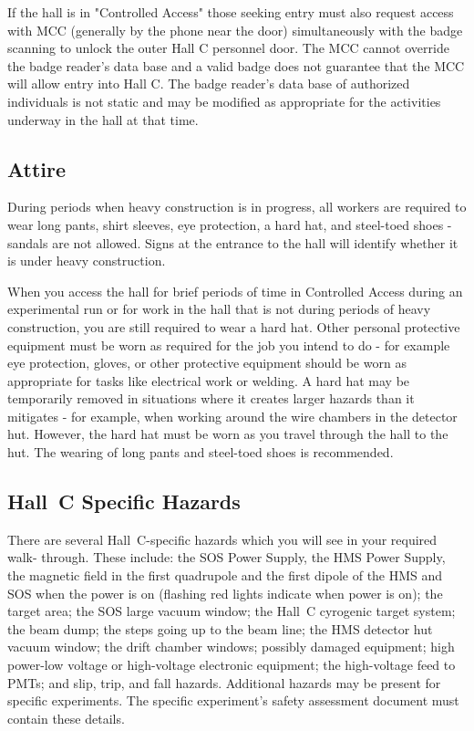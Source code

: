 If the hall is in "Controlled Access" those seeking entry must also
request access with MCC (generally by the phone near the door) simultaneously with the badge
scanning to unlock the outer Hall C personnel door. The MCC cannot override the badge reader's
data base and a valid badge does not guarantee that the MCC will allow entry into Hall C. The
badge reader's data base of authorized individuals is not static and may be modified as
appropriate for the activities underway in the hall at that time.


\subsection{Attire}

During periods when heavy construction is in progress, all workers 
are required to wear long pants, shirt sleeves,
eye protection, a hard hat, and steel-toed shoes - sandals are not allowed. 
Signs at the entrance to the
hall will identify whether it is under heavy construction.

When you access the hall for brief periods of time in Controlled Access
during an
experimental run or for work in the hall that is not during periods of
heavy construction, you are
still required to wear a hard hat. Other personal protective equipment
must be worn as
required for the job you intend to do - for example eye protection, gloves,
or other protective
equipment should be worn as appropriate for tasks like electrical work or
welding.  A hard hat
may be temporarily removed in situations where it creates larger hazards
than it mitigates - for
example, when working around the wire chambers in the detector hut.
However, the hard hat
must be worn as you travel through the hall to the hut. The wearing of long
pants and steel-toed
shoes is recommended.

\subsection{Hall~C Specific Hazards}

There are several Hall~C-specific hazards which you will see in your
required walk-
through. These include: the SOS Power Supply, the HMS Power Supply, the
magnetic field in
the first quadrupole and the first dipole of the HMS and SOS when the power
is on (flashing
red lights indicate when power is on); the target area; the SOS large
vacuum window; the Hall~C
cyrogenic target system; the beam dump; the steps going up to the beam line;
the HMS detector hut
vacuum window; the drift chamber windows; possibly damaged equipment; high 
power-low voltage or
high-voltage electronic equipment; the high-voltage feed to PMTs; and slip,
trip, and fall
hazards. Additional hazards may be present for specific experiments. The
specific experiment's
safety assessment document must contain these details.

